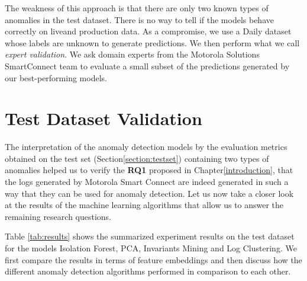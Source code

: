 The weakness of this approach is that there are only two known types of anomalies in the test dataset. There is no way to tell if the models behave correctly on liveand production data. As a compromise, we use a Daily dataset whose labels are unknown to generate predictions. We then perform what we call \textit{expert validation}. We ask domain experts from the Motorola Solutions SmartConnect team to evaluate a small subset of the predictions generated by our best-performing models. 


\section{Test Dataset Validation}

The interpretation of the anomaly detection models by the evaluation metrics obtained on the test set (Section\ref{section:testset}) containing two types of anomalies helped us to verify the \textbf{RQ1} proposed in Chapter\ref{introduction}, that the logs generated by Motorola Smart Connect are indeed generated in such a way that they can be used for anomaly detection. Let us now take a closer look at the results of the machine learning algorithms that allow us to answer the remaining research questions.

Table \ref{tab:results} shows the summarized experiment results on the test dataset for the models Isolation Forest, PCA, Invariants Mining and Log Clustering. We first compare the results in terms of feature embeddings and then discuss how the different anomaly detection algorithms performed in comparison to each other.  

